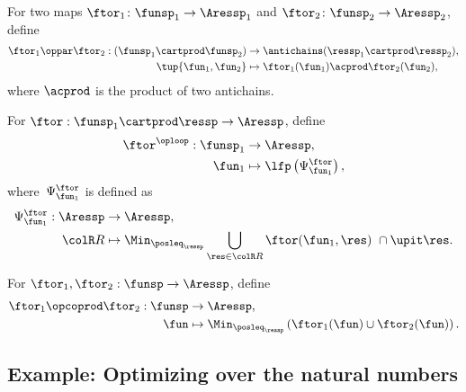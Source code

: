\begin{definition}
     \label{def:oppar}
    For two maps $\ftor_{1}\colon\funsp_{1}\rightarrow\Aressp_{1}$ and $\ftor_{2}\colon\funsp_{2}\rightarrow\Aressp_{2}$, define
    \begin{align}
        \ftor_{1}\oppar\ftor_{2}:(\funsp_{1}\cartprod\funsp_{2}) & \rightarrow\antichains(\ressp_{1}\cartprod\ressp_{2}),\label{eq:oppar}\\
        \tup{ \fun_{1},\fun_{2}}  & \mapsto\ftor_{1}(\fun_{1})\acprod\ftor_{2}(\fun_{2}),\nonumber
    \end{align}
    where $\acprod$ is the product of two antichains.
\end{definition}

\begin{definition}
    \label{def:oploop1}
    For $\ftor:\funsp_{1}\cartprod\ressp\rightarrow\Aressp$,
    define
    \begin{align}
        \ftor^{\oploop}:\funsp_{1} & \rightarrow\Aressp,\nonumber \\
        \fun_{1} & \mapsto\lfp\left(\Psi_{\fun_{1}}^{\ftor}\right),
    \end{align}
    where~$\Psi_{\fun_{1}}^{\ftor}$ is defined as
    \begin{align}
        \Psi_{\fun_{1}}^{\ftor}:\Aressp & \rightarrow\Aressp,\nonumber \\
        {\colR R} & \mapsto\Min_{\posleq_{\ressp}}\bigcup_{\res\in{\colR R}}\ftor(\fun_{1},\res)\ \cap\upit\res.\label{eq:phi}
    \end{align}
\end{definition}

\begin{definition}
    \label{def:opcoprod}For $\ftor_{1},\ftor_{2}:\funsp\rightarrow\Aressp$,
    define
    \begin{align*}
        \ftor_{1}\opcoprod\ftor_{2}:\funsp & \rightarrow\Aressp,\\
        \fun& \mapsto\Min_{\posleq_{\ressp}}\left(\ftor_{1}(\fun)\cup\ftor_{2}(\fun)\right).
    \end{align*}
\end{definition}

\subsection{Example: Optimizing over the natural numbers}

